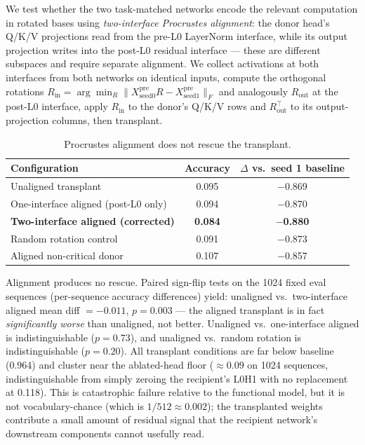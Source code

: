 \documentclass[final]{article}
\begin{document}
We test whether the two task-matched networks encode the relevant computation in
rotated bases using \emph{two-interface Procrustes alignment}: the donor head's
Q/K/V projections read from the pre-L0 LayerNorm interface, while its output
projection writes into the post-L0 residual interface --- these are different
subspaces and require separate alignment. We collect activations at both
interfaces from both networks on identical inputs, compute the orthogonal
rotations $R_{\mathrm{in}} = \arg\min_R \|X_{\text{seed0}}^{\mathrm{pre}} R -
X_{\text{seed1}}^{\mathrm{pre}}\|_F$ and analogously $R_{\mathrm{out}}$ at the
post-L0 interface, apply $R_{\mathrm{in}}$ to the donor's Q/K/V rows and
$R_{\mathrm{out}}^\top$ to its output-projection columns, then transplant.

\begin{table}[h]
\centering
\caption{Procrustes alignment does not rescue the transplant.}
\label{tab:procrustes}
\begin{tabular}{lcc}
\toprule
Configuration & Accuracy & $\Delta$ vs.\ seed 1 baseline \\
\midrule
Unaligned transplant               & 0.095 & $-$0.869 \\
One-interface aligned (post-L0 only)   & 0.094 & $-$0.870 \\
\textbf{Two-interface aligned (corrected)} & \textbf{0.084} & \textbf{$-$0.880} \\
Random rotation control            & 0.091 & $-$0.873 \\
Aligned non-critical donor         & 0.107 & $-$0.857 \\
\bottomrule
\end{tabular}
\end{table}

Alignment produces no rescue. Paired sign-flip tests on the 1024 fixed eval
sequences (per-sequence accuracy differences) yield: unaligned vs.\
two-interface aligned mean diff $= -0.011$, $p=0.003$ --- the aligned
transplant is in fact \emph{significantly worse} than unaligned, not better.
Unaligned vs.\ one-interface aligned is indistinguishable ($p=0.73$), and
unaligned vs.\ random rotation is indistinguishable ($p=0.20$). All
transplant conditions are far below baseline (0.964) and cluster near the
ablated-head floor ($\approx 0.09$ on 1024 sequences, indistinguishable from
simply zeroing the recipient's L0H1 with no replacement at 0.118). This is
catastrophic failure relative to the functional model, but it is not
vocabulary-chance (which is $1/512 \approx 0.002$); the transplanted weights
contribute a small amount of residual signal that the recipient network's
downstream components cannot usefully read.
\end{document}

